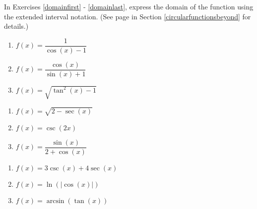 In Exercises \ref{domainfirst} - \ref{domainlast}, express the domain of the function using the extended interval notation. (See page \pageref{extendedinterval} in Section \ref{circularfunctionsbeyond} for details.)

\begin{multicols}{3}

\begin{enumerate}

\setcounter{enumi}{\value{HW}}

\item $f(x) = \dfrac{1}{\cos(x) - 1}$  \label{domainfirst}
\item $f(x) = \dfrac{\cos(x)}{\sin(x) + 1}$
\item $f(x) = \sqrt{\tan^{2}(x) - 1}$ 

\setcounter{HW}{\value{enumi}}

\end{enumerate}

\end{multicols}

\begin{multicols}{3}

\begin{enumerate}

\setcounter{enumi}{\value{HW}}

\item $f(x) = \sqrt{2 - \sec(x)}$ 
\item $f(x) = \csc(2x)$ 
\item $f(x) = \dfrac{\sin(x)}{2 + \cos(x)}$

\setcounter{HW}{\value{enumi}}

\end{enumerate}

\end{multicols}

\begin{multicols}{3}

\begin{enumerate}

\setcounter{enumi}{\value{HW}}

\item $f(x) = 3\csc(x) + 4\sec(x)$ 
\item $f(x) = \ln\left( |\cos(x)| \right)$
\item $f(x) = \arcsin(\tan(x))$ \label{domainlast}

\setcounter{HW}{\value{enumi}}

\end{enumerate}

\end{multicols}

